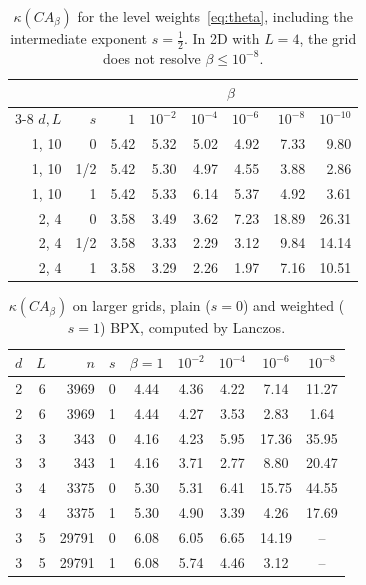 \documentclass[11pt,a4paper]{article}
\theoremstyle{remark}
\begin{document}
\begin{table}[ht]
\centering\small
\begin{tabular}{rrrrrrrr}
\toprule
 & & \multicolumn{6}{c}{$\beta$}\\
\cmidrule(l){3-8}
$d,L$ & $s$ & $1$ & $10^{-2}$ & $10^{-4}$ & $10^{-6}$ & $10^{-8}$ & $10^{-10}$\\
\midrule
1, 10 & 0   & 5.42 & 5.32 & 5.02 & 4.92 & 7.33 & 9.80\\
1, 10 & 1/2 & 5.42 & 5.30 & 4.97 & 4.55 & 3.88 & 2.86\\
1, 10 & 1   & 5.42 & 5.33 & 6.14 & 5.37 & 4.92 & 3.61\\
\midrule
2, 4  & 0   & 3.58 & 3.49 & 3.62 & 7.23 & 18.89 & 26.31\\
2, 4  & 1/2 & 3.58 & 3.33 & 2.29 & 3.12 & 9.84 & 14.14\\
2, 4  & 1   & 3.58 & 3.29 & 2.26 & 1.97 & 7.16 & 10.51\\
\bottomrule
\end{tabular}
\caption{$\kappa(CA_\beta)$ for the level weights~\eqref{eq:theta}, including the
intermediate exponent $s=\tfrac12$. In 2D with $L=4$, the grid does not
resolve $\beta\le10^{-8}$.}
\label{tab:weights}
\end{table}

\begin{table}[ht]
\centering\small
\begin{tabular}{rrrcccccc}
\toprule
$d$ & $L$ & $n$ & $s$ & $\beta=1$ & $10^{-2}$ & $10^{-4}$ & $10^{-6}$ & $10^{-8}$\\
\midrule
2 & 6 & 3969  & 0 & 4.44 & 4.36 & 4.22 & 7.14 & 11.27\\
2 & 6 & 3969  & 1 & 4.44 & 4.27 & 3.53 & 2.83 & 1.64\\
\midrule
3 & 3 & 343   & 0 & 4.16 & 4.23 & 5.95 & 17.36 & 35.95\\
3 & 3 & 343   & 1 & 4.16 & 3.71 & 2.77 & 8.80 & 20.47\\
3 & 4 & 3375  & 0 & 5.30 & 5.31 & 6.41 & 15.75 & 44.55\\
3 & 4 & 3375  & 1 & 5.30 & 4.90 & 3.39 & 4.26 & 17.69\\
3 & 5 & 29791 & 0 & 6.08 & 6.05 & 6.65 & 14.19 & --\\
3 & 5 & 29791 & 1 & 6.08 & 5.74 & 4.46 & 3.12 & --\\
\bottomrule
\end{tabular}
\caption{$\kappa(CA_\beta)$ on larger grids, plain ($s=0$) and weighted ($s=1$)
BPX, computed by Lanczos.}
\label{tab:3d}
\end{table}
\end{document}
